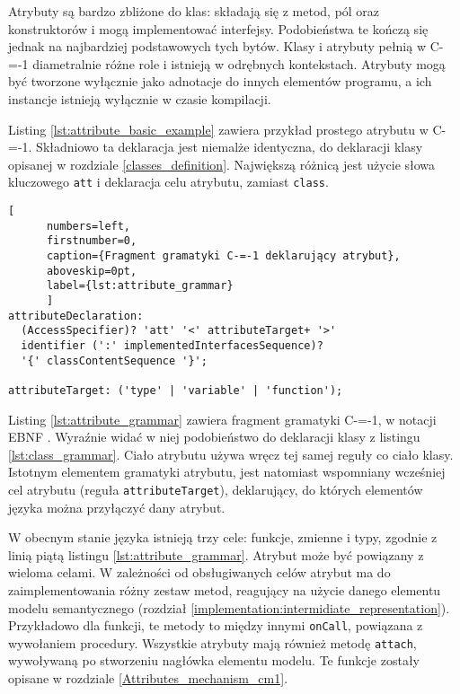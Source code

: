 Atrybuty są bardzo zbliżone do klas: składają się z metod, pól oraz konstruktorów i mogą implementować interfejsy.
Podobieństwa te kończą się jednak na najbardziej podstawowych tych bytów.
Klasy i atrybuty pełnią w C-=-1 diametralnie różne role i istnieją w odrębnych kontekstach.
Atrybuty mogą być tworzone wyłącznie jako adnotacje do innych elementów programu, a ich instancje istnieją wyłącznie w czasie kompilacji.

Listing \ref{lst:attribute_basic_example} zawiera przykład prostego atrybutu w C-=-1.
Składniowo ta deklaracja jest niemalże identyczna, do deklaracji klasy opisanej w rozdziale \ref{classes_definition}.
Największą różnicą jest użycie słowa kluczowego \lstinline{att} i deklaracja celu atrybutu, zamiast \lstinline{class}.

\begin{minipage}{\linewidth}
  
	\begin{lstlisting}[
	  numbers=left,
	  firstnumber=0,
	  caption={Fragment gramatyki C-=-1 deklarujący atrybut},
	  aboveskip=0pt,
	  label={lst:attribute_grammar}
	  ]
attributeDeclaration: 
  (AccessSpecifier)? 'att' '<' attributeTarget+ '>' 
  identifier (':' implementedInterfacesSequence)?
  '{' classContentSequence '}';

attributeTarget: ('type' | 'variable' | 'function');
  \end{lstlisting}
  \end{minipage}

Listing \ref{lst:attribute_grammar} zawiera fragment gramatyki C-=-1, w notacji EBNF \cite{ebnf}.
Wyraźnie widać w niej podobieństwo do deklaracji klasy z listingu \ref{lst:class_grammar}.
Ciało atrybutu używa wręcz tej samej reguły co ciało klasy.
Istotnym elementem gramatyki atrybutu, jest natomiast wspomniany wcześniej cel atrybutu (reguła \lstinline{attributeTarget}), deklarujący, do których elementów języka można przyłączyć dany atrybut.

W obecnym stanie języka istnieją trzy cele: funkcje, zmienne i typy, zgodnie z linią piątą listingu \ref{lst:attribute_grammar}.
Atrybut może być powiązany z wieloma celami.
W zależności od obsługiwanych celów atrybut ma do zaimplementowania różny zestaw metod, reagujący na użycie danego elementu modelu semantycznego (rozdział \ref{implementation:intermidiate_representation}).
Przykładowo dla funkcji, te metody to między innymi \lstinline{onCall}, powiązana z wywołaniem procedury.
Wszystkie atrybuty mają również metodę \lstinline{attach}, wywoływaną po stworzeniu nagłówka elementu modelu.
Te funkcje zostały opisane w rozdziale \ref{Attributes_mechanism_cm1}.

